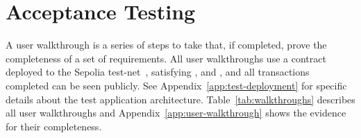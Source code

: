 
\section{Acceptance Testing}\label{sec:acc-tests}

A user walkthrough is a series of steps to take that, if completed, prove the completeness of a set of requirements. 
All user walkthroughs use a contract deployed to the Sepolia test-net~\cite{etherscanio_library_nodate}, satisfying ,  and , and all transactions completed can be seen publicly. See Appendix~\ref{app:test-deployment} for specific details about the test application architecture.
\x
Table~\ref{tab:walkthroughs} describes all user walkthroughs and Appendix~\ref{app:user-walkthrough} shows the evidence for their completeness.

\newcommand{\p}[1]{$P_{#1}$}
\newcommand{\g}[1]{$G_{#1}$}

